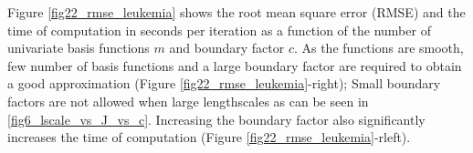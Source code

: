 \documentclass[]{interact}
\theoremstyle{plain}%
\theoremstyle{definition}
\theoremstyle{remark}
\begin{document}
Figure \ref{fig22_rmse_leukemia} shows the root mean square error (RMSE) and the time of computation in seconds per iteration as a function of the number of univariate basis functions $m$ and boundary factor $c$. As the functions are smooth, few number of basis functions and a large boundary factor are required to obtain a good approximation (Figure \ref{fig22_rmse_leukemia}-right); Small boundary factors are not allowed when large lengthscales as can be seen in \ref{fig6_lscale_vs_J_vs_c}. Increasing the boundary factor also significantly increases the time of computation (Figure \ref{fig22_rmse_leukemia}-rleft).
%
\begin{figure}
\centering
{} 

\end{figure}
\end{document}
